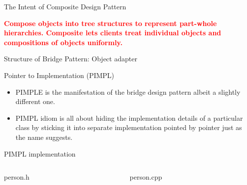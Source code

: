 \documentclass[13pt]{beamer}
\begin{document}
\begin{frame}{The Intent of Composite Design Pattern}
	\begin{center}
	\textcolor{red}{\textbf{Compose objects into tree structures to represent part-whole hierarchies. Composite lets clients treat individual objects and compositions of objects uniformly.}}
	\end{center}
\end{frame}

\begin{frame}{Structure of Bridge Pattern: Object adapter}
	\begin{center}
	\end{center}
\end{frame}

\begin{frame}{Pointer to Implementation (PIMPL)}
	\textcolor{blue}{}
	\begin{itemize}
		\setlength\itemsep{1em}
		\item PIMPLE is the manifestation of the bridge design pattern albeit a slightly different one.
		\item PIMPL idiom is all about hiding the implementation details of a particular class by sticking it into separate implementation pointed by pointer just as the name suggests.
	\end{itemize}
\end{frame}

\begin{frame}{PIMPL implementation}
\begin{columns}[T]
\begin{column}{.45\textwidth}
\lstset{basicstyle=\tiny,style=myCustomCppStyle}
person.h

\end{column}

\begin{column}{.45\textwidth}
\lstset{basicstyle=\tiny,style=myCustomCppStyle}
person.cpp

\end{column}
\end{columns}
\end{frame}
\end{document}
